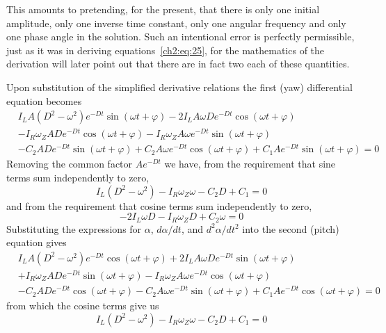 This amounts to pretending, for the present, that there is only one initial
amplitude, only one inverse time constant, only one angular frequency and only
one phase angle in the solution. Such an intentional error is perfectly
permissible, just as it was in deriving equations~\eqref{ch2:eq:25}, for the
mathematics of the derivation will later point out that there are in fact two
each of these quantities.

Upon substitution of the simplified derivative relations the first (yaw)
differential equation becomes
\begin{align*}
&I_L A(D^2 - \omega^2)e^{-Dt}\sin(\omega t + \varphi)
  - 2I_L A\omega D e^{-Dt}\cos(\omega t + \varphi)\\
&- I_R\omega_Z AD e^{-Dt}\cos(\omega t + \varphi)
  - I_R\omega_Z A\omega e^{-Dt}\sin(\omega t + \varphi)\\
&- C_2 AD e^{-Dt}\sin(\omega t + \varphi)
  + C_2 A\omega e^{-Dt}\cos(\omega t + \varphi)
  + C_1 A e^{-Dt}\sin(\omega t + \varphi) = 0
\end{align*}
Removing the common factor $Ae^{-Dt}$ we have, from the requirement that sine
terms sum independently to zero,
\begin{equation*}
I_L(D^2 - \omega^2) - I_R\omega_Z\omega - C_2 D + C_1 = 0
\end{equation*}
and from the requirement that cosine terms sum independently to zero,
\begin{equation*}
-2I_L\omega D - I_R\omega_Z D + C_2\omega = 0
\end{equation*}
Substituting the expressions for $\alpha$, $d\alpha/dt$, and
$d^2\alpha/dt^2$ into the second (pitch) equation gives
\begin{align*}
&I_L A(D^2 - \omega^2)e^{-Dt}\cos(\omega t + \varphi)
  + 2I_L A\omega D e^{-Dt}\sin(\omega t + \varphi)\\
&+ I_R\omega_Z AD e^{-Dt}\sin(\omega t + \varphi)
  - I_R\omega_Z A\omega e^{-Dt}\cos(\omega t + \varphi)\\
&- C_2 AD e^{-Dt}\cos(\omega t + \varphi)
  - C_2 A\omega e^{-Dt}\sin(\omega t + \varphi)
  + C_1 A e^{-Dt}\cos(\omega t + \varphi) = 0
\end{align*}
from which the cosine terms give us
\begin{equation*}
I_L(D^2 - \omega^2) - I_R\omega_Z\omega - C_2 D + C_1 = 0
\end{equation*}
